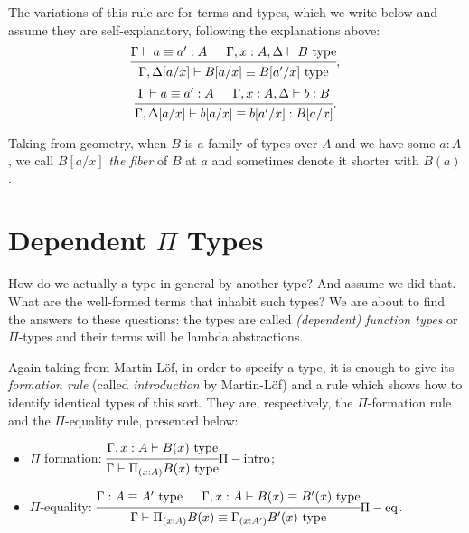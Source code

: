 \begin{enumerate}[(1)]
  The variations of this rule are for terms and types, which we write below
  and assume they are self-explanatory, following the explanations above:
  \[
    \begin{prooftree}
      \hypo{\Gamma \vdash a \equiv a' : A}
      \hypo{\Gamma, x : A, \Delta \vdash B \text{ type}}
      \infer2{\Gamma, \Delta[a/x] \vdash B[a/x] \equiv B[a'/x] \text{ type}}
    \end{prooftree};
  \]
  \[
    \begin{prooftree}
      \hypo{\Gamma \vdash a \equiv a' : A}
      \hypo{\Gamma, x : A, \Delta \vdash b : B}
      \infer2{\Gamma, \Delta[a/x] \vdash b[a/x] \equiv b[a'/x] : B[a/x]}
    \end{prooftree}.
  \]
\end{enumerate}

Taking from geometry, when $ B $ is a family of types over $ A $ and we
have some $ a : A $, we call $ B[a/x] $ \emph{the fiber} of $ B $ at
$ a $ and sometimes denote it shorter with $ B(a) $.

\section{Dependent $ \Pi $ Types}
\label{sec:dep-pi}

How do we actually  a type in general by another type?
And assume we did that. What are the well-formed terms that inhabit
such types? We are about to find the answers to these questions:
the types are called \emph{(dependent) function types} or
$ \Pi $-types and their terms will be lambda abstractions.

Again taking from Martin-L\"{o}f, in order to specify a type, it
is enough to give its \emph{formation rule} (called \emph{introduction}
by Martin-L\"{o}f) and a rule which shows how to identify identical
types of this sort. They are, respectively, the $ \Pi $-formation
rule and the $ \Pi $-equality rule, presented below:
\begin{itemize}
\item $ \Pi $ formation:
  $ \begin{prooftree}
    \hypo{\Gamma, x : A \vdash B(x) \text{ type}}
    \infer1{\Gamma \vdash \Pi_{(x : A)} B(x) \text{ type}}
  \end{prooftree} \Pi-\text{intro}
  $;
\item $ \Pi $-equality:
  $ \begin{prooftree}
    \hypo{\Gamma : A \equiv A' \text{ type}}
    \hypo{\Gamma, x : A \vdash B(x) \equiv B'(x) \text{ type}}
    \infer2{\Gamma \vdash \Pi_{(x : A)} B(x) \equiv %
      \Gamma_{(x : A')} B'(x) \text{ type}}
  \end{prooftree} \Pi-\text{eq}
  $.
\end{itemize}

